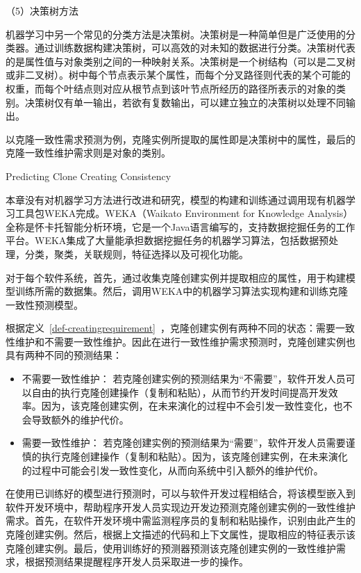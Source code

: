 （5）决策树方法

机器学习中另一个常见的分类方法是决策树。决策树是一种简单但是广泛使用的分类器。通过训练数据构建决策树，可以高效的对未知的数据进行分类。决策树代表的是属性值与对象类别之间的一种映射关系。决策树是一个树结构（可以是二叉树或非二叉树）。树中每个节点表示某个属性，而每个分叉路径则代表的某个可能的权重，而每个叶结点则对应从根节点到该叶节点所经历的路径所表示的对象的类别。决策树仅有单一输出，若欲有复数输出，可以建立独立的决策树以处理不同输出。

 以克隆一致性需求预测为例，克隆实例所提取的属性即是决策树中的属性，最后的克隆一致性维护需求则是对象的类别。


{Predicting Clone Creating Consistency}

本章没有对机器学习方法进行改进和研究，模型的构建和训练通过调用现有机器学习工具包WEKA完成。WEKA（Waikato Environment for Knowledge Analysis）全称是怀卡托智能分析环境，它是一个Java语言编写的，支持数据挖掘任务的工作平台。WEKA集成了大量能承担数据挖掘任务的机器学习算法，包括数据预处理，分类，聚类，关联规则，特征选择以及可视化功能。

对于每个软件系统，首先，通过收集克隆创建实例并提取相应的属性，用于构建模型训练所需的数据集。然后，调用WEKA中的机器学习算法实现构建和训练克隆一致性预测模型。

根据定义~\ref{def-creatingrequirement}~，克隆创建实例有两种不同的状态：需要一致性维护和不需要一致性维护。因此在进行一致性维护需求预测时，克隆创建实例也具有两种不同的预测结果：

\begin{itemize}
\item 
不需要一致性维护：
若克隆创建实例的预测结果为“不需要”，软件开发人员可以自由的执行克隆创建操作（复制和粘贴），从而节约开发时间提高开发效率。因为，该克隆创建实例，在未来演化的过程中不会引发一致性变化，也不会导致额外的维护代价。
\item
需要一致性维护：
若克隆创建实例的预测结果为“需要”，软件开发人员需要谨慎的执行克隆创建操作（复制和粘贴）。因为，该克隆创建实例，在未来演化的过程中可能会引发一致性变化，从而向系统中引入额外的维护代价。
\end{itemize}

在使用已训练好的模型进行预测时，可以与软件开发过程相结合，将该模型嵌入到软件开发环境中，帮助程序开发人员实现边开发边预测克隆创建实例的一致性维护需求。首先，在软件开发环境中需监测程序员的复制和粘贴操作，识别由此产生的克隆创建实例。然后，根据上文描述的代码和上下文属性，提取相应的特征表示该克隆创建实例。最后，使用训练好的预测器预测该克隆创建实例的一致性维护需求，根据预测结果提醒程序开发人员采取进一步的操作。

